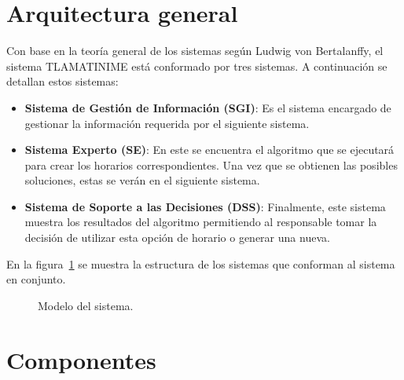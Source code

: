 \label{sec:bosquejoGeneral}

\section{Arquitectura general}

	Con base en la teoría general de los sistemas según Ludwig von Bertalanffy, el sistema TLAMATINIME está conformado por tres sistemas. A continuación se detallan estos sistemas:
	
	\begin{itemize}
		\item \textbf{Sistema de Gestión de Información (SGI)}: Es el sistema encargado de gestionar la información requerida por el siguiente sistema.
		
		\item \textbf{Sistema Experto (SE)}: En este se encuentra el algoritmo que se ejecutará para crear los horarios correspondientes. Una vez que se obtienen las posibles soluciones, estas se verán en el siguiente sistema.
		
		\item \textbf{Sistema de Soporte a las Decisiones (DSS)}: Finalmente, este sistema muestra los resultados del algoritmo permitiendo al responsable tomar la decisión de utilizar esta opción de horario o generar una nueva.
	\end{itemize}
	
	En la figura~\ref{fig:sistemaT} se muestra la estructura de los sistemas que conforman al sistema en conjunto.

	\begin{figure}[htbp!]
		\begin{center}
			\caption{Modelo del sistema.}
			\label{fig:sistemaT}
		\end{center}
	\end{figure}

	

\section{Componentes}

